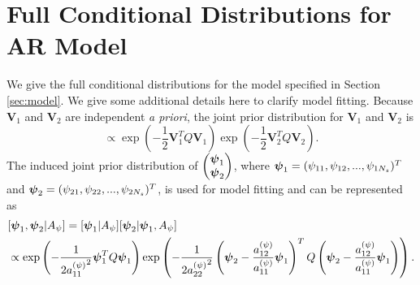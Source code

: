\documentclass[alpha-refs]{wiley-article}
\newcommand{\bpsi}{ \mbox{\boldmath $\psi$} }
\newcommand{\bV}{\textbf{V}}
\begin{document}
\section{Full Conditional Distributions for AR Model}\label{app:gibbs3}

We give the full conditional distributions for the model specified in Section \ref{sec:model}. We give some additional details here to clarify model fitting. Because $\bV_1$ and $\bV_2$ are independent \emph{a priori}, the joint prior distribution for $\bV_1$ and $\bV_2$ is
\begin{equation}
[\bV_1,\bV_2 ] \propto \exp\left(- \frac{1}{2 } \bV_1^T Q \bV_1  \right) \exp\left(- \frac{1}{2 } \bV_2^T Q \bV_2 \right).
\end{equation}
The induced joint prior distribution of $\begin{pmatrix}
\bpsi_{1} \\ \bpsi_{2} \end{pmatrix}$, where $\bpsi_1 = (\psi_{11},\psi_{12},...,\psi_{1N_s} )^T$ and $\bpsi_2 = (\psi_{21},\psi_{22},...,\psi_{2N_s} )^T$, is used for model fitting and can be represented as
\begin{align}
&[\bpsi_1,\bpsi_2 |A_\psi] = [\bpsi_1 | A_\psi] [\bpsi_2 | \bpsi_1,A_\psi] \nonumber \\
&\propto \exp\left(- \frac{1}{2 {a_{11}^{(\psi)}}^2 }  \bpsi_1^T Q \bpsi_1  \right) \exp\left(- \frac{1}{2 {a_{22}^{(\psi)}}^2 } \left(\bpsi_2 - \frac{a_{12}^{(\psi)}}{a_{11}^{(\psi)}} \bpsi_1 \right)^T Q \left(\bpsi_2 - \frac{a_{12}^{(\psi)}}{a_{11}^{(\psi)}} \bpsi_1 \right) \right) .
\end{align}
\end{document}
